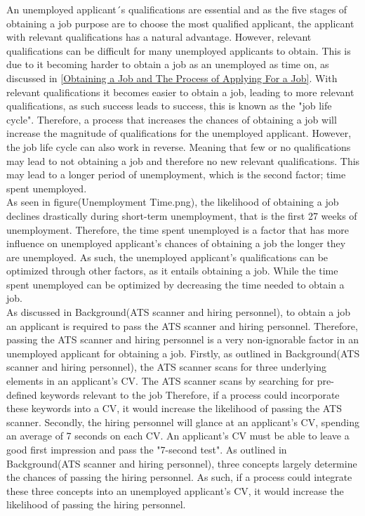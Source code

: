An unemployed applicant´s qualifications are essential and as the five stages of obtaining a job purpose are to choose the most qualified applicant, the applicant with relevant qualifications has a natural advantage.
However, relevant qualifications can be difficult for many unemployed applicants to obtain.
This is due to it becoming harder to obtain a job as an unemployed as time on, as discussed in \ref{Obtaining a Job and The Process of Applying For a Job}.
With relevant qualifications it becomes easier to obtain a job, leading to more relevant qualifications, as such success leads to success, this is known as the "job life cycle".\cite{Job_Cycle}
Therefore, a process that increases the chances of obtaining a job will increase the magnitude of qualifications for the unemployed applicant.
However, the job life cycle can also work in reverse.
Meaning that few or no qualifications may lead to not obtaining a job and therefore no new relevant qualifications.
This may lead to a longer period of unemployment, which is the second factor; time spent unemployed. \\



As seen in figure(Unemployment Time.png), the likelihood of obtaining a job declines drastically during short-term unemployment, that is the first 27 weeks of unemployment.
Therefore, the time spent unemployed is a factor that has more influence on unemployed applicant's chances of obtaining a job the longer they are unemployed.
As such, the unemployed applicant's qualifications can be optimized through other factors, as it entails obtaining a job.
While the time spent unemployed can be optimized by decreasing the time needed to obtain a job. \\

As discussed in Background(ATS scanner and hiring personnel), to obtain a job an applicant is required to pass the ATS scanner and hiring personnel.
Therefore, passing the ATS scanner and hiring personnel is a very non-ignorable factor in an unemployed applicant for obtaining a job.
Firstly, as outlined in Background(ATS scanner and hiring personnel), the ATS scanner scans for three underlying elements in an applicant's CV.
The ATS scanner scans by searching for pre-defined keywords relevant to the job
Therefore, if a process could incorporate these keywords into a CV, it would increase the likelihood of passing the ATS scanner.
Secondly, the hiring personnel will glance at an applicant's CV, spending an average of 7 seconds on each CV.
An applicant's CV must be able to leave a good first impression and pass the "7-second test".
As outlined in Background(ATS scanner and hiring personnel), three concepts largely determine the chances of passing the hiring personnel.
As such, if a process could integrate these three concepts into an unemployed applicant's CV, it would increase the likelihood of passing the hiring personnel. \\

